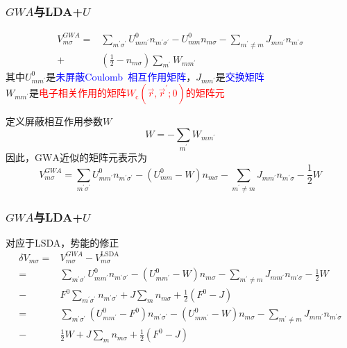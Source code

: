 {\frame
{
	\frametitle{$GWA$与\textrm{LDA+}$U$}
	\begin{displaymath}
		\begin{aligned}
			V_{m\sigma}^{GWA}=&\sum_{m^{\prime}\sigma^{\prime}}U_{mm^{\prime}}^0n_{m^{\prime}\sigma^{\prime}}-U_{mm}^0n_{m\sigma}-\sum_{m^{\prime}\neq m}J_{mm^{\prime}}n_{m^{\prime}\sigma}\\
			+&\left( \frac12-n_{m\sigma} \right)\sum_{m^{\prime}}W_{mm^{\prime}}
		\end{aligned}
	\end{displaymath}
	其中$U_{mm^{\prime}}^0$是\textcolor{blue}{未屏蔽\textrm{Coulomb~}相互作用矩阵}，$J_{mm^{\prime}}$是\textcolor{blue}{交换矩阵}\\
	$W_{mm^{\prime}}$是\textcolor{red}{电子相关作用的矩阵$W_{\mathrm c}(\vec r,\vec r^{\prime};0)$的矩阵元}

	定义屏蔽相互作用参数$W$
	\begin{displaymath}
		W=-\sum_{m^{\prime}}W_{mm^{\prime}}
	\end{displaymath}
	因此，$\mathrm{GWA}$近似的矩阵元表示为
	\begin{displaymath}
			V_{m\sigma}^{GWA}=\sum_{m^{\prime}\sigma^{\prime}}U_{mm^{\prime}}^0n_{m^{\prime}\sigma^{\prime}}-(U_{mm}^0-W)n_{m\sigma}-\sum_{m^{\prime}\neq m}J_{mm^{\prime}}n_{m^{\prime}\sigma}-\frac12W
	\end{displaymath}
}

\frame
{
	\frametitle{$GWA$与\textrm{LDA+}$U$}
	对应于\textrm{LSDA}，势能的修正
	\begin{displaymath}
		\begin{aligned}
			\delta V_{m\sigma}=&V_{m\sigma}^{GWA}-V_{m\sigma}^{\mathrm{LSDA}}\\
			=&\sum_{m^{\prime}\sigma^{\prime}}U_{mm^{\prime}}^0n_{m^{\prime}\sigma^{\prime}}-(U_{mm^{\prime}}^0-W)n_{m\sigma}-\sum_{m^{\prime}\neq m}J_{mm^{\prime}}n_{m^{\prime}\sigma}-\frac12W\\
			-&F^0\sum_{m^{\prime}\sigma^{\prime}}n_{m^{\prime}\sigma^{\prime}}+J\sum_mn_{m\sigma}+\frac12(F^0-J)\\
			=&\sum_{m^{\prime}\sigma^{\prime}}(U_{mm^{\prime}}^0-F^0)n_{m^{\prime}\sigma^{\prime}}-(U_{mm^{\prime}}^0-W)n_{m\sigma}-\sum_{m^{\prime}\neq m}J_{mm^{\prime}}n_{m^{\prime}\sigma}\\
			-&\frac12W+J\sum_mn_{m\sigma}+\frac12(F^0-J)
		\end{aligned}
	\end{displaymath}
}

}
